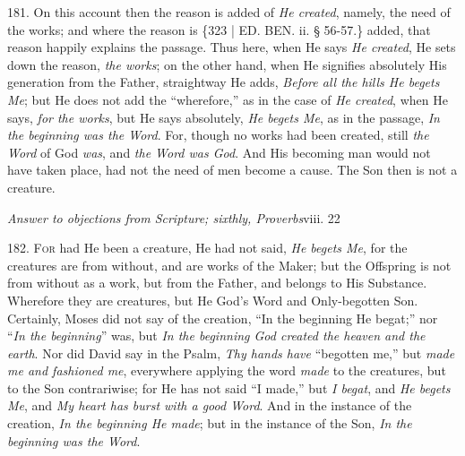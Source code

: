 181. On this account then the
reason is added of \emph{He created}, namely, the need of the works;
and where the reason is \{323
| ED. BEN. ii. § 56-57.\} added, that reason happily explains the
passage. Thus here, when He says \emph{He created}, He sets down the
reason, \emph{the works}; on the other hand, when He signifies
absolutely His generation from the Father, straightway He adds, \emph{Before
all the hills He begets Me}; but He does not add the ``wherefore,''
as in the case of \emph{He created}, when He says, \emph{for the works},
but He says absolutely, \emph{He begets Me}, as in the passage, \emph{In
the beginning was the Word}. For, though no works had been created,
still \emph{the Word} of God \emph{was}, and \emph{the Word was God}.
And His becoming man would not have taken place, had not the need of
men become a cause. The Son then is not a creature.


\emph{Answer
to objections from Scripture; sixthly, Proverbs}viii.
22

182. F\textsc{or} had He been a
creature, He had not said, \emph{He begets Me}, for the creatures are
from without, and are works of the Maker; but the Offspring is not
from without as a work, but from the Father, and belongs to His
Substance. Wherefore they are creatures, but He God's Word and
Only-begotten Son. Certainly, Moses did not say of the creation, ``In
the beginning He begat;'' nor ``\emph{In the beginning}'' was, but \emph{In
the beginning God created the heaven and the earth}. Nor did David
say in the Psalm, \emph{Thy hands have} ``begotten me,'' but \emph{made me
and fashioned me}, everywhere applying the word \emph{made} to the
creatures, but to the Son contrariwise; for He has not said ``I made,''
but \emph{I begat}, and \emph{He begets Me}, and \emph{My heart has burst
with a good Word}. And in the instance of the creation, \emph{In the
beginning He made}; but in the instance of the Son, \emph{In the
beginning was the Word}.

